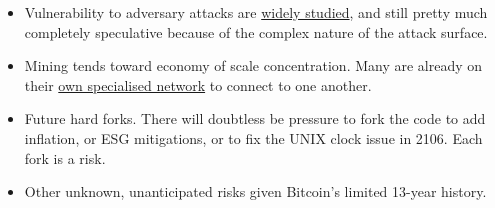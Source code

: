 \begin{itemize}
\item Vulnerability to adversary attacks are \href{https://braiins.com/blog/bitcoin-mining-attacks-explained}{widely studied}\cite{apostolaki2016hijacking, apostolaki2017hijacking, johnson2014game}, and still pretty much completely speculative because of the complex nature of the attack surface.
\item Mining tends toward economy of scale concentration. Many are already on their \href{https://bitcoinfibre.org/}{own specialised network} to connect to one another.
\item Future hard forks. There will doubtless be pressure to fork the code to add inflation, or ESG mitigations, or to fix the UNIX clock issue in 2106. Each fork is a risk.
\item Other unknown, unanticipated risks given Bitcoin’s limited 13-year history.
\end{itemize} 


%

